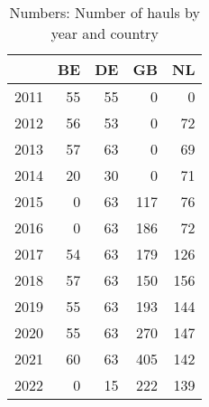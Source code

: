 \begin{table}[ht]
\centering
\begin{tabular}{rrrrr}
  \hline
 & BE & DE & GB & NL \\ 
  \hline
2011 & 55 & 55 & 0 & 0 \\ 
  2012 & 56 & 53 & 0 & 72 \\ 
  2013 & 57 & 63 & 0 & 69 \\ 
  2014 & 20 & 30 & 0 & 71 \\ 
  2015 & 0 & 63 & 117 & 76 \\ 
  2016 & 0 & 63 & 186 & 72 \\ 
  2017 & 54 & 63 & 179 & 126 \\ 
  2018 & 57 & 63 & 150 & 156 \\ 
  2019 & 55 & 63 & 193 & 144 \\ 
  2020 & 55 & 63 & 270 & 147 \\ 
  2021 & 60 & 63 & 405 & 142 \\ 
  2022 & 0 & 15 & 222 & 139 \\ 
   \hline
\end{tabular}
\caption{Numbers: Number of hauls by year and country} 
\end{table}
